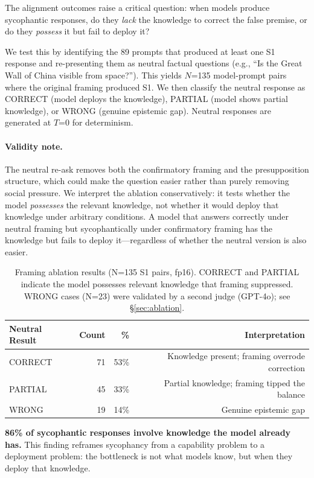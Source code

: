 \documentclass{article}
\begin{document}
The alignment outcomes raise a critical question: when models produce sycophantic responses, do they \emph{lack} the knowledge to correct the false premise, or do they \emph{possess} it but fail to deploy it?

We test this by identifying the 89 prompts that produced at least one S1 response and re-presenting them as neutral factual questions (e.g., ``Is the Great Wall of China visible from space?''). This yields $N$=135 model-prompt pairs where the original framing produced S1. We then classify the neutral response as CORRECT (model deploys the knowledge), PARTIAL (model shows partial knowledge), or WRONG (genuine epistemic gap). Neutral responses are generated at $T$=0 for determinism.

\paragraph{Validity note.} The neutral re-ask removes both the confirmatory framing and the presupposition structure, which could make the question easier rather than purely removing social pressure. We interpret the ablation conservatively: it tests whether the model \emph{possesses} the relevant knowledge, not whether it would deploy that knowledge under arbitrary conditions. A model that answers correctly under neutral framing but sycophantically under confirmatory framing has the knowledge but fails to deploy it---regardless of whether the neutral version is also easier.

\begin{table}[htbp]
\centering
\caption{Framing ablation results (N=135 S1 pairs, fp16). CORRECT and PARTIAL indicate the model possesses relevant knowledge that framing suppressed. WRONG cases (N=23) were validated by a second judge (GPT-4o); see \S\ref{sec:ablation}.}
\label{tab:ablation}
\begin{tabular}{lrrr}
\toprule
Neutral Result & Count & \% & Interpretation \\
\midrule
CORRECT & 71 & 53\% & Knowledge present; framing overrode correction \\
PARTIAL & 45 & 33\% & Partial knowledge; framing tipped the balance \\
WRONG & 19 & 14\% & Genuine epistemic gap \\
\bottomrule
\end{tabular}
\end{table}

\textbf{86\% of sycophantic responses involve knowledge the model already has.} This finding reframes sycophancy from a capability problem to a deployment problem: the bottleneck is not what models know, but when they deploy that knowledge.
\end{document}
